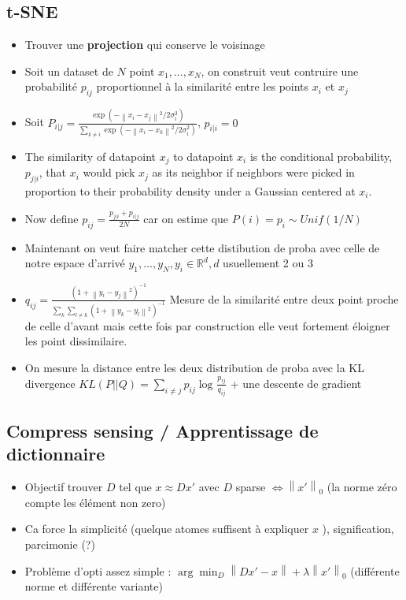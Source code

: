 \documentclass{article}
\begin{document}
\begin{multicols}{2}
\subsection{t-SNE}
\begin{itemize}
    \item Trouver une \textbf{projection} qui conserve le voisinage
    \item Soit un dataset de $ N $ point $ x_1, \dots, x_N $, on construit veut contruire une probabilité $ p_{ij} $ proportionnel à la similarité entre les points $ x_i $ et $ x_j $ 
    \item Soit $ P_{i|j} = \frac{ \exp (- \left\| x_i - x_j \right\| ^2 / 2 \sigma_i ^2 ) }{\sum_{k \neq i}^{} \exp (- \left\| x_i - x_k \right\| ^2 / 2 \sigma_i ^2 ) } $, $ p_{i|i} = 0 $ 
    \item The similarity of datapoint $x_{j}$ to datapoint $x_{i}$ is the conditional probability, $ p_{j|i} $, that $x_{i}$ would pick $x_{j}$ as its neighbor if neighbors were picked in proportion to their probability density under a Gaussian centered at $x_{i}$.
    \item Now define $ p_{ij} = \frac{p_{j|i} + p_{i|j}}{2N}$ car on estime que $ P(i) = p_i \sim Unif (1/N) $ 
    \item Maintenant on veut faire matcher cette distibution de proba avec celle de notre espace d'arrivé $ y_1, \dots, y_N, y_i \in \mathbb{R}^d, d $ usuellement 2 ou 3
    \item $ q_{ij} = \frac{(1 + \left\| y_i - y_j \right\| ^2) ^{-1}}{\sum_{k}^{} \sum_{l \neq k}^{} ( 1 + \left\| y_k - y_l \right\| ^2) ^{-1}}$ Mesure de la similarité entre deux point proche de celle d'avant mais cette fois par construction elle veut fortement éloigner les point dissimilaire.
    \item On mesure la distance entre les deux distribution de proba avec la KL divergence $ KL(P || Q) = \sum_{i \neq j}^{}p_{ij} \log_{} \frac{p_{ij}}{q_{ij}} $ + une descente de gradient 
\end{itemize}

\subsection{Compress sensing / Apprentissage de dictionnaire}
\begin{itemize}
    \item Objectif trouver $ D $ tel que $ x \approx D x' $ avec $ D $ sparse $ \Leftrightarrow \left\| x' \right\|_0  $ (la norme zéro compte les élément non zero)
    \item Ca force la simplicité (quelque atomes suffisent à expliquer $ x $ ), signification, parcimonie (?)
    \item Problème d'opti assez simple : $ \arg \min _D \left\| D x' - x \right\| + \lambda \left\| x' \right\| _0 $ (différente norme et différente variante)
\end{itemize}


\end{multicols}
\end{document}

